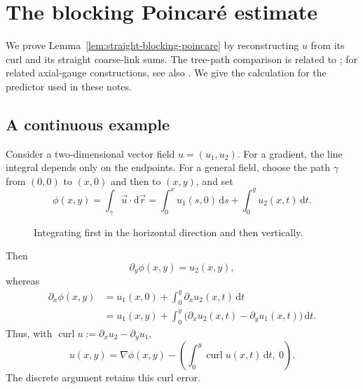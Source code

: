 \documentclass[10pt,reqno]{amsart}
\theoremstyle{definition}
\theoremstyle{remark}
\numberwithin{equation}{section}
\numberwithin{figure}{section}
\newcommand{\dd}{\mathrm d}
\begin{document}
\section{The blocking Poincar\'e estimate}\label{sec:blocking-poincare}
We prove Lemma~\ref{lem:straight-blocking-poincare} by reconstructing $u$
from its curl and its straight coarse-link sums. The tree-path comparison
is related to \cite[Sect.~B, Lemma~1, pp.~79--80]{Bal85g}; for related
axial-gauge constructions, see also \cite{Dim15}. We give the calculation
for the predictor used in these notes.

\subsection{A continuous example}
Consider a two-dimensional vector field $u=(u_1,u_2)$. For a gradient,
the line integral depends only on the endpoints. For a general field,
choose the path $\gamma$ from $(0,0)$ to $(x,0)$ and then to $(x,y)$, and set
\begin{equation}\label{eq:continuous-coordinate-potential}
\phi(x,y)=\int_\gamma\vec u\cdot\dd\vec r
=\int_0^xu_1(s,0)\,\dd s+\int_0^yu_2(x,t)\,\dd t.
\end{equation}
\begin{figure}[htbp]
\centering
{}
\caption{Integrating first in the horizontal direction and then vertically.}
\label{fig:continuous-coordinate-path}
\end{figure}
Then
\begin{equation}\label{eq:continuous-potential-y}
\partial_y\phi(x,y)=u_2(x,y),
\end{equation}
whereas
\begin{equation}\label{eq:continuous-potential-x}
\begin{aligned}
\partial_x\phi(x,y)
&=u_1(x,0)+\int_0^y\partial_xu_2(x,t)\,\dd t\\
&=u_1(x,y)+\int_0^y
\bigl(\partial_xu_2(x,t)-\partial_yu_1(x,t)\bigr)\,\dd t.
\end{aligned}
\end{equation}
Thus, with $\operatorname{curl}u:=\partial_xu_2-\partial_yu_1$,
\begin{equation}\label{eq:continuous-curl-decomposition}
u(x,y)=\nabla\phi(x,y)
-\left(\int_0^y\operatorname{curl}u(x,t)\,\dd t,\ 0\right).
\end{equation}
The discrete argument retains this curl error.
\end{document}
